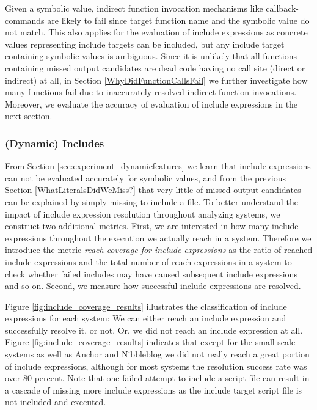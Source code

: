 \documentclass[sigconf]{acmart}
\renewcommand{\sf}[1]{\textsf{#1}}
\begin{document}
Given a symbolic value, indirect function invocation mechanisms like
callback-commands are likely to fail since target function name and the symbolic value do not match.
This also applies for the evaluation of include expressions as concrete values
representing include targets can be included, but any include target containing
symbolic values is ambiguous. Since it is unlikely that all functions containing
missed output candidates are dead code having no call site (direct or
indirect) at all, in Section \ref{WhyDidFunctionCallsFail} we further
investigate how many functions fail due to inaccurately resolved indirect
function invocations. Moreover, we evaluate the accuracy of evaluation of
include expressions in the next section.

\subsubsection{(Dynamic) Includes}
\label{WhyDidIncludesFail}
From Section \ref{sec:experiment_dynamicfeatures} we learn that include
expressions can not be evaluated accurately for symbolic values, and from the
previous Section \ref{WhatLiteralsDidWeMiss?} that very little of missed output
candidates can be explained by simply missing to include a file. To better
understand the impact of include expression resolution throughout analyzing
systems, we construct two additional metrics. First, we are interested in how
many include expressions throughout the execution we actually reach in a system.
Therefore we introduce the metric \emph{reach coverage for include expressions}
as the ratio of reached include expressions and the total number of reach
expressions in a system to check whether failed includes may have caused
subsequent include expressions and so on. Second, we measure how successful
include expressions are resolved. 

Figure \ref{fig:include_coverage_results} illustrates the classification of
include expressions for each system: We can either reach an include expression
and successfully resolve it, or not. Or, we did not reach an include expression at all. 
Figure \ref{fig:include_coverage_results} indicates that except for the
small-scale systems as well as \sf{Anchor} and \sf{Nibbleblog} we did not really
reach a great portion of include expressions, although for most systems the
resolution success rate was over 80 percent. Note that one failed attempt
to include a script file can result in a cascade of missing more include
expressions as the include target script file is not included and executed.
\end{document}
